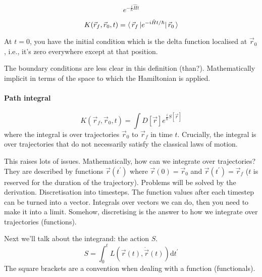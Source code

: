 \documentclass[a4paper]{extarticle}
\newcommand{\tpr}{t^\prime}
\newcommand{\dtpr}{\text{d}t^\prime}
\begin{document}
\begin{dfn}
  \begin{equation}
    e^{-\frac{i}{\hbar} \hat{H} t}
  \end{equation}
\end{dfn}

\begin{dfn}
  [Propagator]
  \begin{equation}
    K(\vec{r}_f, \vec{r}_0, t) = \langle\,\vec{r}_f\,\rvert e^{-i \hat{H} t / \hbar} \lvert\,\vec{r}_0\,\rangle
  \end{equation}
\end{dfn}

At $t = 0$, you have the initial condition which is the delta function localised
at $\vec{r}_0$, i.e., it's zero everywhere except at that position.

The boundary conditions are less clear in this definition (than?).
Mathematically implicit in terms of the space to which the Hamiltonian is applied.

\paragraph{Path integral}

\begin{equation}
  K(\vec{r}_f, \vec{r}_0, t) = \int D \left[\vec{r}\right] e^{\frac{i}{\hbar} S\left[\vec{r}\right] }
\end{equation}
where the integral is over trajectories $\vec{r}_0$ to $\vec{r}_f$ in time $t$.
Crucially, the integral is over trajectories that do not necessarily satisfy the
classical laws of motion.

This raises lots of issues.
Mathematically, how can we integrate over trajectories?
They are described by functions $\vec{r}(\tpr)$ where $\vec{r}(0) = \vec{r}_0$ and
$\vec{r}(\tpr) = \vec{r}_f$ ($t$ is reserved for the duration of the trajectory).
Problems will be solved by the derivation.
Discretisation into timesteps.
The function values after each timestep can be turned into a vector.
Integrals over vectors we can do, then you need to make it into a limit.
Somehow, discretising is the answer to how we integrate over trajectories (functions).

Next we'll talk about the integrand: the action $S$.
\begin{equation}
  S = \int_0^t L\left(\vec{r}(t), \dot{\vec{r}}(t)\right) \dtpr
\end{equation}
The square brackets are a convention when dealing with a function (functionals).
\end{document}
